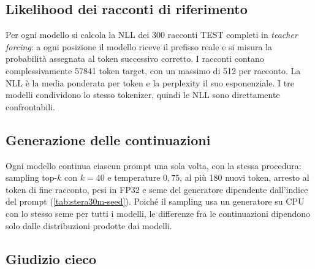 \subsection{Likelihood dei racconti di riferimento}

Per ogni modello si calcola la NLL dei 300 racconti TEST completi in \emph{teacher forcing}: a ogni posizione il modello riceve il prefisso reale e si misura la probabilità assegnata al token successivo corretto. I racconti contano complessivamente \num{57841} token target, con un massimo di 512 per racconto. La NLL è la media ponderata per token e la perplexity il suo esponenziale. I tre modelli condividono lo stesso tokenizer, quindi le NLL sono direttamente confrontabili.

\subsection{Generazione delle continuazioni}

Ogni modello continua ciascun prompt una sola volta, con la stessa procedura: sampling top-$k$ con $k=40$ e temperature $0{,}75$, al più 180 nuovi token, arresto al token di fine racconto, pesi in FP32 e seme del generatore dipendente dall'indice del prompt (\autoref{tab:stera30m-seed}). Poiché il sampling usa un generatore su CPU con lo stesso seme per tutti i modelli, le differenze fra le continuazioni dipendono solo dalle distribuzioni prodotte dai modelli.

\subsection{Giudizio cieco}
\label{sec:metodo-giudizio}

